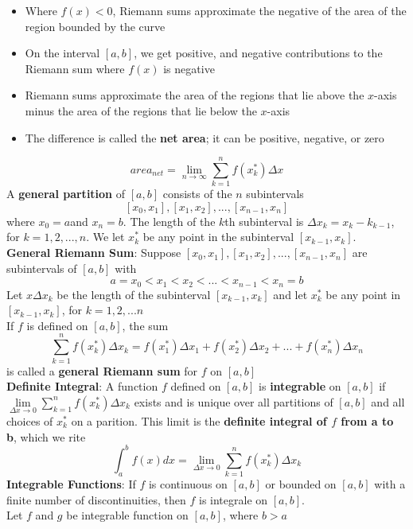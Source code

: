 \documentclass{article}
\begin{document}
\begin{itemize}
    \begin{itemize}
        \item Where $f(x) < 0$, Riemann sums approximate the negative of the area of the region bounded by the curve
        \item On the interval $[a,b]$, we get positive, and negative contributions to the Riemann sum where $f(x)$ is negative
        \item Riemann sums approximate the area of the regions that lie above the $x$-axis minus the area of the regions that lie below the $x$-axis
        \item The difference is called the \textbf{net area}; it can be positive, negative, or zero
    \end{itemize}
    $$area_{net} = \lim_{n \to \infty}{\sum_{k = 1}^{n}{f(x_k^*)\Delta{x}}}$$
    A \textbf{general partition} of $[a,b]$ consists of the $n$ subintervals
    $$[x_0,x_1],[x_1,x_2],...,[x_{n - 1}, x_n]$$
    where $x_0 = a$and $x_n = b$. The length of the $k$th subinterval is $\Delta{x_k} = x_k - k_{k-1}$, for $k = 1,2,...,n$. We let $x_k^*$ be any point in the subinterval $[x_{k - 1}, x_k]$. \\
    \textbf{General Riemann Sum}: Suppose $[x_0,x_1],[x_1, x_2],...,[x_{n - 1}, x_n]$ are subintervals of $[a,b]$ with
    $$a = x_0 < x_1 < x_2 < ... < x_{n - 1} < x_n = b$$
    Let $x\Delta{x_k}$ be the length of the subinterval $[x_{k - 1}, x_k]$ and let $x_k^*$ be any point in $[x_{k - 1}, x_k]$, for $k = 1,2,...n$ \\
    If $f$ is defined on $[a,b]$, the sum
    $$\sum_{k = 1}^{n}{f(x_k^*)\Delta{x_k}} = f(x_1^*)\Delta{x_1} + f(x_2^*)\Delta{x_2} + ... + f(x_n^*)\Delta{x_n}$$
    is called a \textbf{general Riemann sum} for $f$ on $[a,b]$ \\
    \textbf{Definite Integral}: A function $f$ defined on $[a,b]$ is \textbf{integrable} on $[a,b]$ if $\lim\limits_{\Delta{x} \to 0}{\sum\limits_{k = 1}^{n}{f(x_k^*)\Delta{x_k}}}$ exists and is unique over all partitions of $[a,b]$ and all choices of $x_k^*$ on a parition. This limit is the \textbf{definite integral of $f$ from a to b}, which we rite
    $$\int_a^b{f(x)dx} = \lim_{\Delta{x} \to 0}{\sum_{k = 1}^{n}{f(x_k^*)\Delta{x_k}}}$$
    \textbf{Integrable Functions}: If $f$ is continuous on $[a,b]$ or bounded on $[a,b]$ with a finite number of discontinuities, then $f$ is integrale on $[a,b]$. \\
    Let $f$ and $g$ be integrable function on $[a,b]$, where $b > a$
    \begin{enumerate}

\end{enumerate}
\end{itemize}
\end{document}
